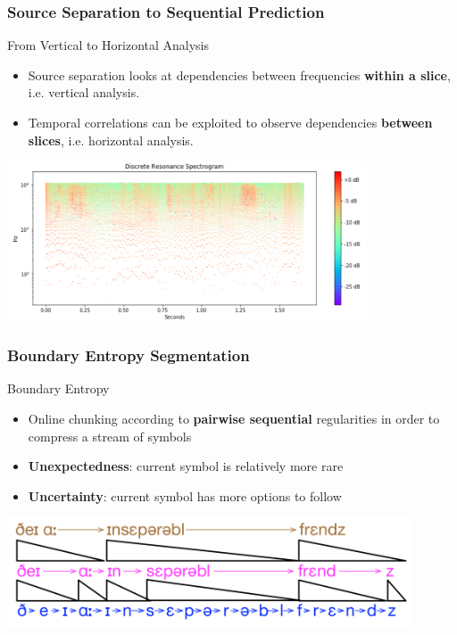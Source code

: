 \usetikzlibrary{arrows, positioning}

\begin{frame}
  \frametitle{Source Separation to Sequential Prediction}
  \begin{block}{From Vertical to Horizontal Analysis}
    \begin{itemize}
      \item Source separation looks at dependencies between frequencies \textbf{within a slice}, i.e. vertical analysis.
      \item Temporal correlations can be exploited to observe dependencies \textbf{between slices}, i.e. horizontal analysis.
    \end{itemize}
  \end{block}
  \begin{center}
    \includegraphics[width=0.8\textwidth]{images/padeogram-wide.png}
  \end{center}
\end{frame}

\begin{frame}
  \frametitle{Boundary Entropy Segmentation}
  \begin{block}{Boundary Entropy}
    \begin{itemize}
      \item Online chunking according to \textbf{pairwise sequential} regularities in order to compress a stream of symbols
      \item \textbf{Unexpectedness}: current symbol is relatively more rare
      \item \textbf{Uncertainty}: current symbol has more options to follow
    \end{itemize}
  \end{block}
  \begin{center}
    \includegraphics[width=0.9\textwidth]{images/phonetic-sequential-memory.png}
  \end{center}
\end{frame}

